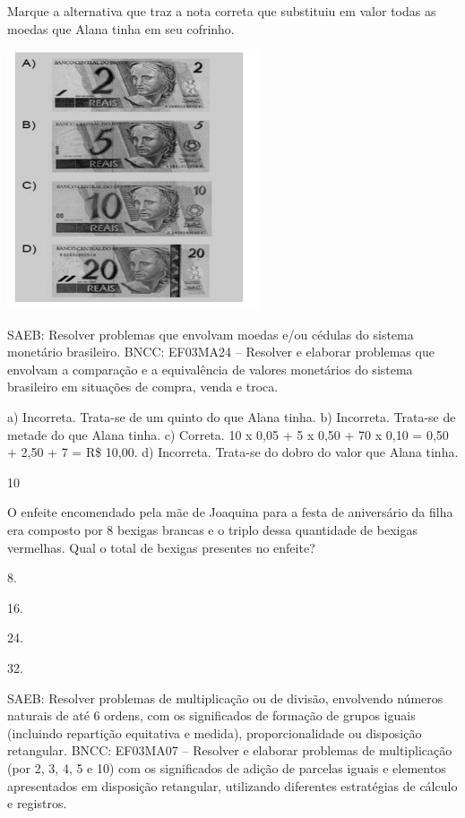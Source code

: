 \begin{multicols}{2}
{\begin{escolha}
{Marque a alternativa que traz a nota correta que substituiu em valor todas as moedas que Alana tinha em seu cofrinho.


\includegraphics[width=2.93590in,height=3.00930in]{media/image135.png}

SAEB: Resolver problemas que envolvam moedas e/ou cédulas do sistema monetário brasileiro.
BNCC: EF03MA24 -- Resolver e elaborar problemas que envolvam a comparação e a equivalência de
valores monetários do sistema brasileiro em situações de compra, venda e troca.

a) Incorreta. Trata-se de um quinto do que Alana tinha.
b) Incorreta. Trata-se de metade do que Alana tinha.
c) Correta. 10 x 0,05 + 5 x 0,50 + 70 x 0,10 = 0,50 + 2,50 + 7 = R\$ 10,00.
d) Incorreta. Trata-se do dobro do valor que Alana tinha.

\num{10}

O enfeite encomendado pela mãe de Joaquina para a festa de aniversário da filha era composto por 8 bexigas brancas e o triplo dessa quantidade de bexigas vermelhas. Qual o total de bexigas presentes no enfeite?

\begin{escolha}

\item
  8.
\item
  16.
\item
  24.
\item
  32.
\end{escolha}

SAEB: Resolver problemas de multiplicação ou de divisão, envolvendo números naturais de até 6 ordens, com os significados de formação de grupos iguais (incluindo repartição equitativa e medida), proporcionalidade ou disposição retangular.
BNCC: EF03MA07 – Resolver e elaborar problemas de multiplicação (por 2, 3, 4, 5 e 10) com os significados de adição de parcelas iguais e elementos apresentados em disposição retangular, utilizando diferentes estratégias de cálculo e registros.

}
\end{escolha}}
\end{multicols}
